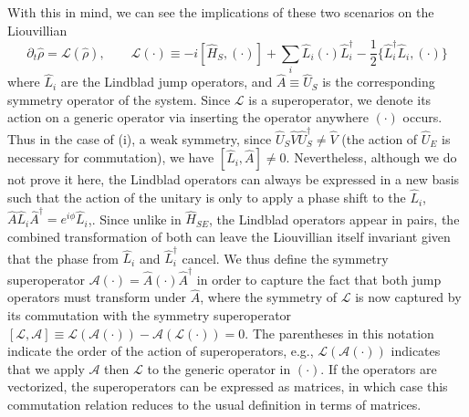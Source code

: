 With this in mind, we can see the implications of these two scenarios on the Liouvillian 
\begin{equation}
    \partial_t \hat \rho = \mathcal{L}(\hat \rho), \qquad
    \mathcal{L}(\cdot) \equiv -i[\hat H_S,(\cdot)] + \sum_i \hat L_i(\cdot) \hat L_i^\dagger - \frac{1}{2} \{\hat L_i^\dagger \hat L_i, (\cdot)\}
\end{equation} 
where $\hat L_i$ are the Lindblad jump operators, and $\hat A \equiv \hat U_S$ is the corresponding symmetry operator of the system. Since $\mathcal{L}$ is a superoperator, we denote its action on a generic operator via inserting the operator anywhere $(\cdot)$ occurs. 
Thus in the case of (i), a weak symmetry, since $\hat U_S \hat V \hat U_S^\dagger \neq \hat V$ (the action of $\hat U_E$ is necessary for commutation), we have $[\hat L_i, \hat A] \neq 0$. Nevertheless, although we do not prove it here,  the Lindblad operators can always be expressed in a new basis such that the action of the unitary is only to apply a phase shift to the $\hat L_i$, $\hat A \hat L_i \hat A^\dagger = e^{i \phi} \hat L_i$,. 
Since unlike in $\hat H_{SE}$, the Lindblad operators appear in pairs,  the combined transformation of both can leave the Liouvillian itself invariant given that the phase from $\hat L_i$ and $\hat L_i^\dagger$ cancel. 
We thus define the symmetry superoperator $\mathcal{A}(\cdot) = \hat A (\cdot) \hat A^\dagger$ in order to capture the fact that both jump operators must transform under $\hat A$, where the symmetry of $\mathcal{L}$ is now captured by its commutation with the symmetry superoperator $[\mathcal{L},\mathcal{A}] \equiv \mathcal{L}(\mathcal{A}(\cdot)) - \mathcal{A}(\mathcal{L}(\cdot)) = 0$. The parentheses in this notation indicate the order of the action of superoperators, e.g., $\mathcal{L}(\mathcal{A}(\cdot))$ indicates that we apply $\mathcal{A}$ then $\mathcal{L}$ to the generic operator in $(\cdot)$. If the operators are vectorized, the superoperators can be expressed as matrices, in which case this commutation relation reduces to the usual definition in terms of matrices. 


